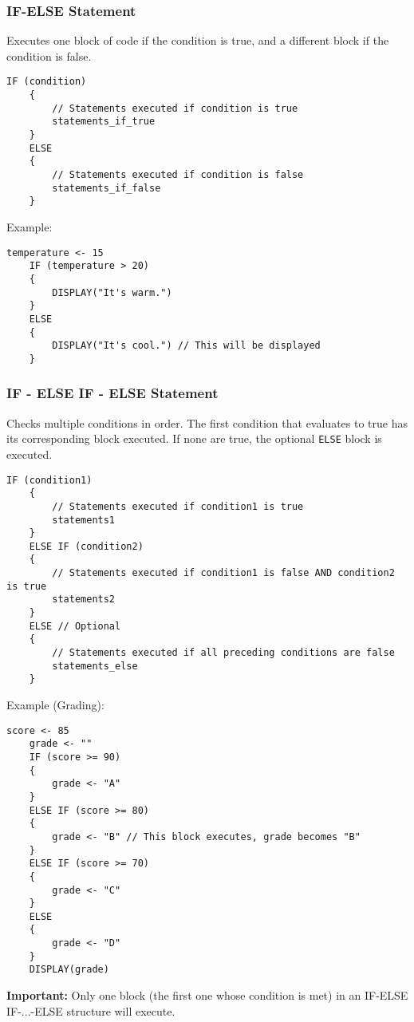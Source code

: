 \documentclass[11pt,oneside]{book}
\begin{document}
\subsubsection*{IF-ELSE Statement}
Executes one block of code if the condition is true, and a different block if the condition is false.
\begin{lstlisting}[language={}, label={lst:if_else}, caption={AP Pseudocode: IF-ELSE}]
    IF (condition)
    {
        // Statements executed if condition is true
        statements_if_true
    }
    ELSE
    {
        // Statements executed if condition is false
        statements_if_false
    }
\end{lstlisting}
Example:
\begin{lstlisting}[language={}]
    temperature <- 15
    IF (temperature > 20)
    {
        DISPLAY("It's warm.")
    }
    ELSE
    {
        DISPLAY("It's cool.") // This will be displayed
    }
\end{lstlisting}

\subsubsection*{IF - ELSE IF - ELSE Statement}
Checks multiple conditions in order. The first condition that evaluates to true has its corresponding block executed. If none are true, the optional \texttt{ELSE} block is executed.
\begin{lstlisting}[language={}, label={lst:if_elseif_else}, caption={AP Pseudocode: IF - ELSE IF - ELSE}]
    IF (condition1)
    {
        // Statements executed if condition1 is true
        statements1
    }
    ELSE IF (condition2)
    {
        // Statements executed if condition1 is false AND condition2 is true
        statements2
    }
    ELSE // Optional
    {
        // Statements executed if all preceding conditions are false
        statements_else
    }
\end{lstlisting}
Example (Grading):
\begin{lstlisting}[language={}, label={lst:grading_example}]
    score <- 85
    grade <- ""
    IF (score >= 90)
    {
        grade <- "A"
    }
    ELSE IF (score >= 80)
    {
        grade <- "B" // This block executes, grade becomes "B"
    }
    ELSE IF (score >= 70)
    {
        grade <- "C"
    }
    ELSE
    {
        grade <- "D"
    }
    DISPLAY(grade)
\end{lstlisting}
\textbf{Important:} Only one block (the first one whose condition is met) in an IF-ELSE IF-...-ELSE structure will execute.
\end{document}
